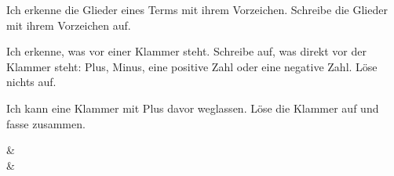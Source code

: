 \setcounter{aufgabe}{7}

\begin{aufgabe}{Ich erkenne die Glieder eines Terms mit ihrem Vorzeichen. Schreibe die Glieder mit ihrem Vorzeichen auf.}
\begin{geruest}
\end{geruest}
\end{aufgabe}

\begin{aufgabe}{Ich erkenne, was vor einer Klammer steht. Schreibe auf, was direkt vor der Klammer steht: Plus, Minus, eine positive Zahl oder eine negative Zahl. Löse nichts auf.}
\begin{geruest}
\end{geruest}
\end{aufgabe}

\begin{aufgabe}{Ich kann eine Klammer mit Plus davor weglassen. Löse die Klammer auf und fasse zusammen.}
\begin{gleichungsraster}[2]
 &  \\ \noalign{\vspace{5mm}}
 &  \\ \noalign{\vspace{5mm}}
\end{gleichungsraster}
\end{aufgabe}

